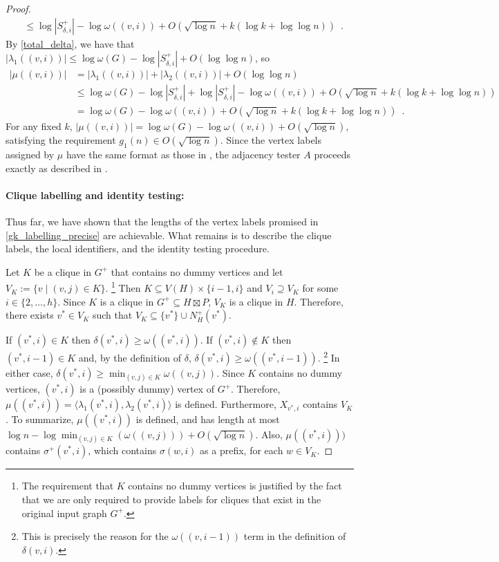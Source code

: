 \documentclass[twoside,leqno]{article}
\let\eqref\cref
\renewcommand{\ge}{\geqslant}
\renewcommand{\le}{\leqslant}
\newcommand{\Oh}{O}
\begin{document}
\begin{proof}
\begin{align*}
       & \le \log |S^+_{\delta,i}|-\log \omega((v,i)) + \Oh(\sqrt{\log n} + k(\log k+\log\log n)) \enspace .
    \end{align*}
    By \eqref{total_delta}, we have that $|\lambda_1((v,i))|\le \log\omega(G) - \log |S^+_{\delta,i}| + \Oh(\log\log n)$, so
    \begin{align*}
      |\mu((v,i))|
       & = |\lambda_1((v,i))|+|\lambda_2((v,i))| + \Oh(\log\log n)                                                                        \\
       & \le \log\omega(G) - \log |S^+_{\delta,i}| + \log |S^+_{\delta,i}|-\log \omega((v,i)) + \Oh(\sqrt{\log n} + k(\log k+\log\log n)) \\
       & = \log\omega(G) - \log\omega((v,i)) + \Oh(\sqrt{\log n} + k(\log k+\log\log n)) \enspace .
    \end{align*}
    For any fixed $k$, $|\mu((v,i))|=\log \omega(G)-\log \omega((v,i)) + \Oh(\sqrt{\log n})$, satisfying the requirement $g_1(n)\in\Oh(\sqrt{\log n})$. Since the vertex labels assigned by $\mu$ have the same format as those in \cite{alstrup.dahlgaard.ea:optimal,dujmovic.esperet.ea:adjacency}, the adjacency tester $A$ proceeds exactly as described in \cite{alstrup.rauhe:improved,dujmovic.esperet.ea:adjacency}.

    \paragraph{Clique labelling and identity testing:}
    Thus far, we have shown that the lengths of the vertex labels promised in \cref{gk_labelling_precise} are achievable. 
    What remains is to describe the clique labels, the local identifiers, and the identity testing procedure.

    Let $K$ be a clique in $G^+$ that contains no dummy vertices and let $V_K:=\{v\mid (v,j)\in K\}$.%
    \footnote{The requirement that $K$ contains no dummy vertices is justified by the fact that we are only required to provide labels for cliques that exist in the original input graph $G^+$.}
    Then $K\subseteq V(H)\times\{i-1,i\}$  and $V_i\supseteq V_K$ for some $i\in\{2,\ldots,h\}$.  Since $K$ is a clique in $G^+\subseteq H\boxtimes P$, $V_K$ is a clique in $H$.  Therefore, there exists $v^*\in V_K$ such that $V_K\subseteq \{v^*\}\cup N^+_H(v^*)$.

    If $(v^*,i)\in K$ then $\delta(v^*,i)\ge \omega((v^*,i))$. If $(v^*,i)\not\in K$ then $(v^*,i-1)\in K$ and, by the definition of $\delta$, $\delta(v^*,i)\ge \omega((v^*,i-1))$.%
    \footnote{This is precisely the reason for the $\omega((v,i-1))$ term in the definition of $\delta(v,i)$.}
    In either case, $\delta(v^*,i)\ge\min_{(v,j)\in K}\omega((v,j))$.  Since $K$ contains no dummy vertices, $(v^*,i)$ is a (possibly dummy) vertex of $G^+$.  Therefore, $\mu((v^*,i))=\langle \lambda_1(v^*,i),\lambda_2(v^*,i)\rangle$ is defined.  Furthermore, $X_{v^*,i}$ contains $V_K$.  To summarize, $\mu((v^*,i))$ is defined, and has length at most $\log n - \log\min_{(v,j)\in K}(\omega((v,j))) + \Oh(\sqrt{\log n})$.  Also, $\mu((v^*,i)))$ contains $\sigma^+(v^*,i)$, which contains $\sigma(w,i)$ as a prefix, for each $w\in V_K$.


\end{proof}
\end{document}
